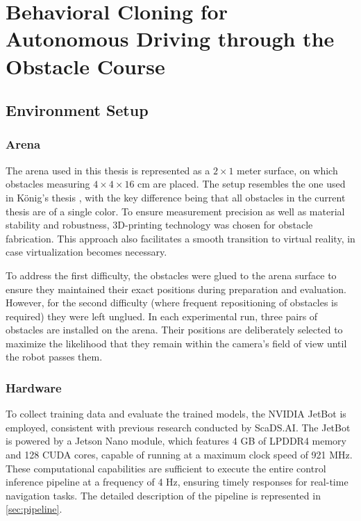 \chapter{Behavioral Cloning for Autonomous Driving through the Obstacle Course}
\label{cha:Main}

\section{Environment Setup}

\subsection{Arena}

The arena used in this thesis is represented as a \(2 \times 1\) meter surface, on which obstacles measuring \(4 \times 4 \times 16\) cm are placed. The setup resembles the one used in König’s thesis \autocite{konig2022model}, with the key difference being that all obstacles in the current thesis are of a single color. To ensure measurement precision as well as material stability and robustness, 3D-printing technology was chosen for obstacle fabrication. This approach also facilitates a smooth transition to virtual reality, in case virtualization becomes necessary.

To address the first difficulty, the obstacles were glued to the arena surface to ensure they maintained their exact positions during preparation and evaluation. However, for the second difficulty (where frequent repositioning of obstacles is required) they were left unglued. In each experimental run, three pairs of obstacles are installed on the arena. Their positions are deliberately selected to maximize the likelihood that they remain within the camera’s field of view until the robot passes them.

\subsection{Hardware}

To collect training data and evaluate the trained models, the NVIDIA JetBot is employed, consistent with previous research conducted by ScaDS.AI. The JetBot is powered by a Jetson Nano module, which features 4 GB of LPDDR4 memory and 128 CUDA cores, capable of running at a maximum clock speed of 921 MHz. These computational capabilities are sufficient to execute the entire control inference pipeline at a frequency of 4 Hz, ensuring timely responses for real-time navigation tasks. The detailed description of the pipeline is represented in \autoref{sec:pipeline}.


